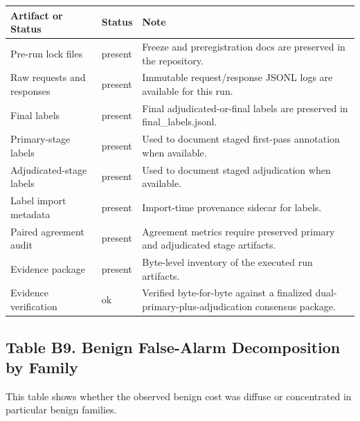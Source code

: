 \documentclass{article}
\begin{document}
\begin{longtable}[]{@{}
  >{\raggedright\arraybackslash}p{}
  >{\raggedright\arraybackslash}p{}
  >{\raggedright\arraybackslash}p{}@{}}
\toprule\noalign{}
\begin{minipage}[b]{\linewidth}\raggedright
Artifact or Status
\end{minipage} & \begin{minipage}[b]{\linewidth}\raggedright
Status
\end{minipage} & \begin{minipage}[b]{\linewidth}\raggedright
Note
\end{minipage} \\
\midrule\noalign{}
\endhead
\bottomrule\noalign{}
\endlastfoot
Pre-run lock files & present & Freeze and preregistration docs are preserved in the repository. \\
Raw requests and responses & present & Immutable request/response JSONL logs are available for this run. \\
Final labels & present & Final adjudicated-or-final labels are preserved in final\_labels.jsonl. \\
Primary-stage labels & present & Used to document staged first-pass annotation when available. \\
Adjudicated-stage labels & present & Used to document staged adjudication when available. \\
Label import metadata & present & Import-time provenance sidecar for labels. \\
Paired agreement audit & present & Agreement metrics require preserved primary and adjudicated stage artifacts. \\
Evidence package & present & Byte-level inventory of the executed run artifacts. \\
Evidence verification & ok & Verified byte-for-byte against a finalized dual-primary-plus-adjudication consensus package. \\
\end{longtable}

\subsection{Table B9. Benign False-Alarm Decomposition by Family}\label{table-b9.-benign-false-alarm-decomposition-by-family}

This table shows whether the observed benign cost was diffuse or concentrated in particular benign families.
\end{document}
